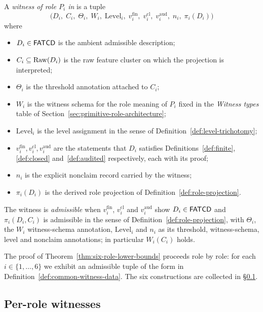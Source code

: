 \begin{definition}\label{def:common-witness-data}
A \emph{witness of role \(P_i\) in \FATCD{}} is a tuple
\[
\bigl(D_i,\; C_i,\; \Theta_i,\; W_i,\; \mathrm{Level}_i,\;
v_i^{\mathrm{fin}},\; v_i^{\mathrm{cl}},\; v_i^{\mathrm{aud}},\;
n_i,\; \pi_i(D_i)\bigr)
\]
where
\begin{itemize}[topsep=2pt,itemsep=1pt]
  \item \(D_i \in \mathsf{FATCD}{}\) is the ambient admissible description;
  \item \(C_i \subseteq \operatorname{Raw}\!\left(D_i\right)\) is the raw feature cluster on which
    the projection is interpreted;
  \item \(\Theta_i\) is the threshold annotation attached to \(C_i\);
  \item \(W_i\) is the witness schema for the role meaning of \(P_i\)
    fixed in the \emph{Witness types} table of
    Section~\ref{sec:primitive-role-architecture};
  \item \(\mathrm{Level}_i\) is the level assignment in the sense of
    Definition~\ref{def:level-trichotomy};
  \item \(v_i^{\mathrm{fin}}, v_i^{\mathrm{cl}}, v_i^{\mathrm{aud}}\) are
    the statements that \(D_i\) satisfies Definitions~\ref{def:finite},
    \ref{def:closed} and~\ref{def:audited} respectively, each with its proof;
  \item \(n_i\) is the explicit nonclaim record carried by the witness;
  \item \(\pi_i(D_i)\) is the derived role projection of
    Definition~\ref{def:role-projection}.
\end{itemize}
The witness is \emph{admissible} when \(v_i^{\mathrm{fin}}\),
\(v_i^{\mathrm{cl}}\) and \(v_i^{\mathrm{aud}}\) show \(D_i\in\mathsf{FATCD}{}\) and
\(\pi_i(D_i,C_i)\) is admissible in the sense of
Definition~\ref{def:role-projection}, with \(\Theta_i\), the \(W_i\)
witness-schema annotation, \(\mathrm{Level}_i\) and \(n_i\) as its threshold,
witness-schema, level and nonclaim annotations; in particular \(W_i(C_i)\)
holds.
\end{definition}

The proof of Theorem~\ref{thm:six-role-lower-bounds} proceeds role by
role: for each \(i \in \{1,\ldots,6\}\) we exhibit an admissible
tuple of the form in Definition~\ref{def:common-witness-data}. The
six constructions are collected in
\S\ref{subsec:per-role-witnesses}.

\subsection{Per-role witnesses}\label{subsec:per-role-witnesses}

